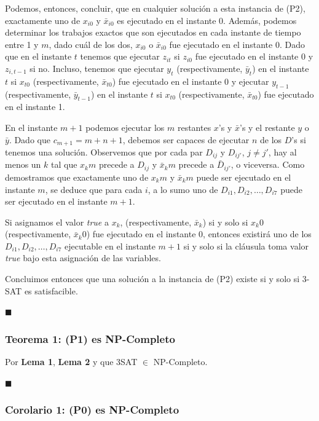 \documentclass[14pt]{extarticle}
\begin{document}
Podemos, entonces, concluir, que en cualquier solución a esta instancia de (P2), exactamente uno de $x_{i0}$ y $\bar x_{i0}$ es ejecutado en el instante 0. Además, podemos determinar los trabajos exactos que son ejecutados en cada instante de tiempo entre 1 y $m$, dado cuál de los dos, $x_{i0}$ o $\bar x_{i0}$ fue ejecutado en el instante 0. Dado que en el instante $t$ tenemos que ejecutar $z_{it}$ si $z_{i0}$ fue ejecutado en el instante 0 y $z_{i, t-1}$ si no. Incluso, tenemos que ejecutar $y_t$ (respectivamente, $\bar y_t$) en el instante $t$ si $x_{t0}$ (respectivamente, $\bar x_{t0}$) fue ejecutado en el instante 0 y ejecutar $y_{t - 1}$ (respectivamente, $\bar y_{t - 1}$) en el instante $t$ si $x_{t0}$ (respectivamente, $\bar x_{t0}$) fue ejecutado en el instante 1.

En el instante $m + 1$ podemos ejecutar los $m$ restantes $x$'s y $\bar x$'s y el restante $y$ o $\bar y$. Dado que $c_{m+1} = m + n + 1$, debemos ser capaces de ejecutar $n$ de los $D$'s si tenemos una solución. Observemos que por cada par $D_{ij}$ y  $D_{ij'}$, $j \neq j'$, hay al menos un $k$ tal que $x_km$ precede a $D_{ij}$ y $\bar x_km$ precede a $\bar D_{ij'}$, o viceversa. Como demostramos que exactamente uno de $x_km$ y $\bar x_km$ puede ser ejecutado en el instante $m$, se deduce que para cada $i$, a lo sumo uno de $D_{i1}, D_{i2}, \ldots, D_{i7}$ puede ser ejecutado en el instante $m + 1$.

Si asignamos el valor \textit{true} a $x_k$, (respectivamente, $\bar x_k$) si y solo si $x_k0$ (respectivamente, $\bar x_k0$) fue ejecutado en el instante 0, entonces existirá uno de los $D_{i1}, D_{i2}, \ldots, D_{i7}$ ejecutable en el instante $m + 1$ si y solo si la cláusula toma valor \textit{true} bajo esta asignación de las variables.

Concluimos entonces que una solución a la instancia de (P2) existe si y solo si 3-SAT es satisfacible.

$\blacksquare$

\subsubsection*{Teorema 1: (P1) es NP-Completo}

Por \textbf{Lema 1}, \textbf{Lema 2} y que 3SAT $\in$ NP-Completo.

$\blacksquare$

\subsubsection*{Corolario 1: (P0) es NP-Completo}
\end{document}
